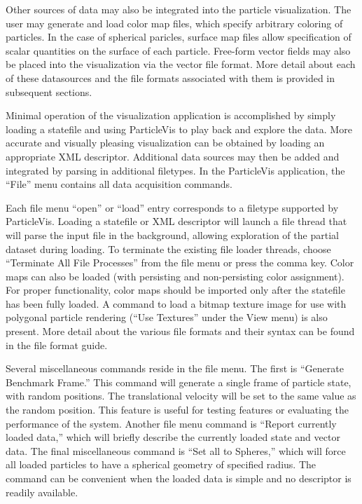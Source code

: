 Other sources of data may also be integrated into the particle visualization.   The user may generate and load color map files, which specify arbitrary coloring of particles.  In the case of spherical paricles, surface map files allow specification of scalar quantities on the surface of each particle.  Free-form vector fields may also be placed into the visualization via the vector file format.  More detail about each of these datasources and the file formats associated with them is provided in subsequent sections.  

Minimal operation of the visualization application is accomplished by simply loading a statefile and using ParticleVis to play back and explore the data.  More accurate and visually pleasing visualization can  be obtained by loading an appropriate XML descriptor.  Additional data sources may then be added and integrated by parsing in additional filetypes.  In the ParticleVis application, the ``File'' menu contains all data acquisition commands.

Each file menu ``open'' or ``load'' entry corresponds to a filetype supported by ParticleVis.  Loading a statefile or XML descriptor will launch a file thread that will parse the input file in the background, allowing exploration of the partial dataset during loading.  To terminate the existing file loader threads, choose ``Terminate All File Processes'' from the file menu or press the comma key.  Color maps can also be loaded (with persisting and non-persisting color assignment).  For proper functionality, color maps should be imported only after the statefile has been fully loaded.  A command to load a bitmap texture image for use with polygonal particle rendering (``Use Textures'' under the View menu) is also present.  More detail about the various file formats and their syntax can be found in the file format guide.

Several miscellaneous commands reside in the file menu.  The first is ``Generate Benchmark Frame.''  This command will generate a single frame of particle state, with random positions.  The translational velocity will be set to the same value as the random position.  This feature is useful for testing features or evaluating the performance of the system.  Another file menu command is ``Report currently loaded data,'' which will briefly describe the currently loaded state and vector data.  The final miscellaneous command is ``Set all to Spheres,'' which will force all loaded particles to have a spherical geometry of specified radius.  The command can be convenient when the loaded data is simple and no descriptor is readily available.

